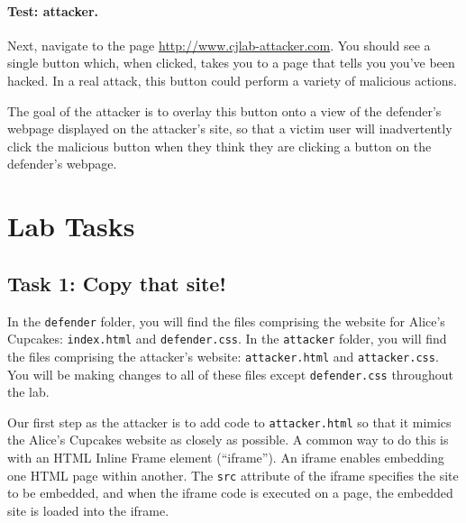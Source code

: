 \paragraph{Test: attacker.}
Next, navigate to the page \url{http://www.cjlab-attacker.com}.  You
should see a single button which, when clicked, takes you to a page that
tells you you've been hacked. In a real attack, this button could 
perform a variety of malicious actions.  

The goal of the attacker is to overlay this button onto a view of the
defender's webpage displayed on the attacker's site, so that a victim
user will inadvertently click the malicious button when they think they
are clicking a button on the defender's webpage.


\section{Lab Tasks} 


\subsection{Task 1: Copy that site!}

In the \texttt{defender} folder, you will find the files comprising the
website for Alice's Cupcakes: \texttt{index.html} and
\texttt{defender.css}.  In the \texttt{attacker} folder, you will find
the files comprising the attacker's website: \texttt{attacker.html} and
\texttt{attacker.css}.  You will be making changes to all of these files
except \texttt{defender.css} throughout the lab. 

Our first step as the attacker is to add code to \texttt{attacker.html}
so that it mimics the Alice's Cupcakes website as closely as possible.
A common way to do this is with an HTML Inline Frame element
(``iframe''). An iframe enables embedding one HTML page within another.
The \texttt{src} attribute of the iframe specifies the site to be
embedded, and when the iframe code is executed on a page, the embedded
site is loaded into the iframe. 

